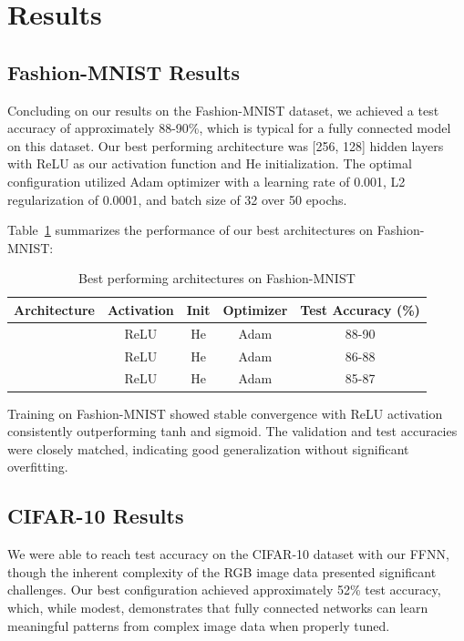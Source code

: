 
\section{Results}
\label{sec:majhead}

\subsection{Fashion-MNIST Results}

Concluding on our results on the Fashion-MNIST dataset, we achieved a test accuracy of approximately 88-90\%, which is typical for a fully connected model on this dataset. Our best performing architecture was [256, 128] hidden layers with ReLU as our activation function and He initialization. The optimal configuration utilized Adam optimizer with a learning rate of 0.001, L2 regularization of 0.0001, and batch size of 32 over 50 epochs.

Table~\ref{tab:fashion_mnist_results} summarizes the performance of our best architectures on Fashion-MNIST:

\begin{table}[htb]
\centering
\caption{Best performing architectures on Fashion-MNIST}
\label{tab:fashion_mnist_results}
\begin{tabular}{lcccc}
\hline
Architecture & Activation & Init & Optimizer & Test Accuracy (\%) \\
\hline
[256, 128] & ReLU & He & Adam & 88-90 \\
[128, 64] & ReLU & He & Adam & 86-88 \\
[512, 256] & ReLU & He & Adam & 85-87 \\
\hline
\end{tabular}
\end{table}

Training on Fashion-MNIST showed stable convergence with ReLU activation consistently outperforming tanh and sigmoid. The validation and test accuracies were closely matched, indicating good generalization without significant overfitting.

\subsection{CIFAR-10 Results}

We were able to reach test accuracy on the CIFAR-10 dataset with our FFNN, though the inherent complexity of the RGB image data presented significant challenges. Our best configuration achieved approximately 52\% test accuracy, which, while modest, demonstrates that fully connected networks can learn meaningful patterns from complex image data when properly tuned.

